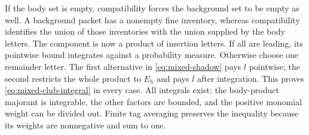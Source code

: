 If the body set is empty, compatibility forces the background set to
be empty as well. A background packet has a nonempty fine inventory,
whereas compatibility identifies the union of those inventories with
the union supplied by the body letters. The component is now a product
of insertion letters. If all are leading, its pointwise bound integrates
against a probability measure. Otherwise choose one remainder letter.
The first alternative in \eqref{eq:mixed-shadow} pays $l$ pointwise;
the second restricts the whole product to $E_h$ and pays $l$ after
integration. This proves \eqref{eq:mixed-club-integral} in every case.
All integrals exist: the body-product majorant is integrable, the other
factors are bounded, and the positive monomial weight can be divided
out. Finite tag averaging preserves the inequality because its weights
are nonnegative and sum to one.

